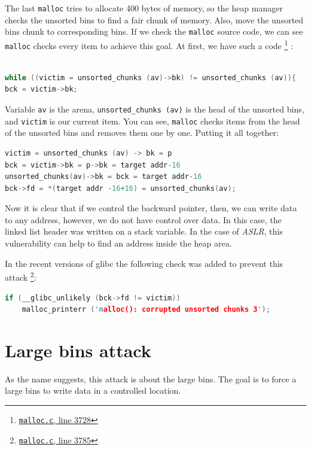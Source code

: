 \documentclass{masterthesis}
\newcommand*\libc{glibc}
\newcommand*\ub{unsorted bins}
\newcommand*\lb{large bins}
\newcommand*\Lb{Large bins\xspace}
\newcommand*\mallocc{\lstinline{malloc}\xspace}
\begin{document}
The last \mallocc{} tries to allocate 400 bytes of memory, so the heap manager checks the \ub{} to find a fair chunk of memory. Also, move the \ub{} chunk to corresponding bins. If we check the \mallocc{} source code, we can see \mallocc{} checks every item to achieve this goal. At first, we have such a code \footnote{\href{https://sourceware.org/git/?p=glibc.git;a=blob;f=malloc/malloc.c;h=f7cd29bc2f93e1082ee77800bd64a4b2a2897055;hb=9ea3686266dca3f004ba874745a4087a89682617\#l3728}{\texttt{malloc.c}, line 3728}} :
\begin{lstlisting}[language=c,frame=tlrb]

while ((victim = unsorted_chunks (av)->bk) != unsorted_chunks (av)){
bck = victim->bk;
\end{lstlisting}
Variable \lstinline{av} is the arena, \lstinline{unsorted_chunks (av)} is the head of the \ub{}, and \lstinline{victim} is our current item. You can see, \mallocc{} checks items from the head of the \ub{} and removes them one by one. Putting it all together:

\begin{lstlisting}[language=c,frame=tlrb]
victim = unsorted_chunks (av) -> bk = p
bck = victim->bk = p->bk = target addr-16
unsorted_chunks(av)->bk = bck = target addr-16
bck->fd = *(target addr -16+16) = unsorted_chunks(av);
\end{lstlisting}

Now it is clear that if we control the backward pointer, then, we can write data to any address, however, we do not have control over data. In this case, the linked list header was written on a stack variable. In the case of \emph{ASLR}, this vulnerability can help to find an address inside the heap area.

In the recent versions of \libc{} the following check was added to prevent this attack \footnote{\href{https://sourceware.org/git/?p=glibc.git;a=blob;f=malloc/malloc.c;h=f7cd29bc2f93e1082ee77800bd64a4b2a2897055;hb=9ea3686266dca3f004ba874745a4087a89682617\#l3785}{\texttt{malloc.c}, line 3785}}:

\begin{lstlisting}[language=c,frame=tlrb]
if (__glibc_unlikely (bck->fd != victim))
	malloc_printerr ('malloc(): corrupted unsorted chunks 3');
\end{lstlisting}

\section{\Lb{} attack}
\label{sect:lbattack}
As the name suggests, this attack is about the \lb{}. The goal is to force a \lb{} to write data in a controlled location.
\end{document}
